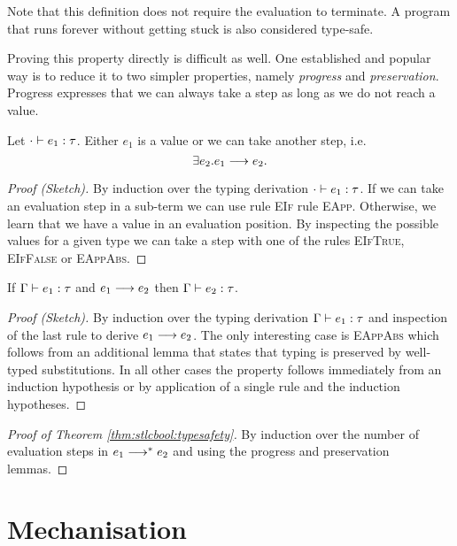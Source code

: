 {Note that this definition does not require the evaluation to terminate. A
program that runs forever without getting stuck is also considered type-safe.

Proving this property directly is difficult as well. One established and popular
way is to reduce it to two simpler properties, namely \emph{progress} and
\emph{preservation}. Progress expresses that we can always take a step as long
as we do not reach a value.
\begin{lem}[Progress]
  Let ${\cdot} \vdash {e_1} : {\tau}$. Either $e_1$ is a value or we can take
  another step, i.e.
  \[ \exists e_2. {e_1} \longrightarrow {e_2}. \]
  \begin{proof}[Proof (Sketch)]
    By induction over the typing derivation ${\cdot} \vdash {e_1} : {\tau}$. If we
    can take an evaluation step in a sub-term we can use rule \textsc{EIf} rule
    \textsc{EApp}. Otherwise, we learn that we have a value in an evaluation
    position. By inspecting the possible values for a given type we can take a
    step with one of the rules \textsc{EIfTrue}, \textsc{EIfFalse} or
    \textsc{EAppAbs}.
  \end{proof}
\end{lem}

\begin{lem}[Preservation]
  If ${\Gamma} \vdash {e_1} : {\tau}$ and ${e_1} \longrightarrow {e_2}$ then
  ${\Gamma} \vdash {e_2} : {\tau}$.
  \begin{proof}[Proof (Sketch)]
    By induction over the typing derivation ${\Gamma} \vdash {e_1} : {\tau}$ and
    inspection of the last rule to derive ${e_1} \longrightarrow {e_2}$. The only
    interesting case is \textsc{EAppAbs} which follows from an additional lemma
    that states that typing is preserved by well-typed substitutions. In all
    other cases the property follows immediately from an induction hypothesis or
    by application of a single rule and the induction hypotheses.
  \end{proof}
\end{lem}

\begin{proof}[Proof of Theorem \ref{thm:stlcbool:typesafety}]
  By induction over the number of evaluation steps in ${e_1} \longrightarrow^* {e_2}$ and
  using the progress and preservation lemmas.
\end{proof}


\section{Mechanisation}

}

